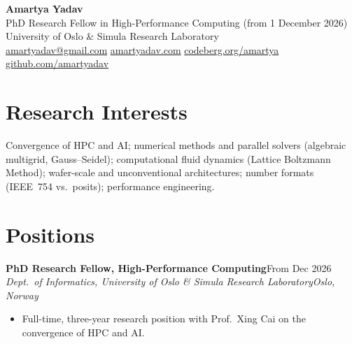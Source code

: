\documentclass[10pt,a4paper]{article}
\newcommand{\entry}[4]{%
  \textbf{#1}\hfill #2\\
  \textit{#3}\hfill \textit{#4}\par\vspace{2pt}}
\begin{document}
{\centering
  {\LARGE\bfseries Amartya Yadav}\\[4pt]
  PhD Research Fellow in High-Performance Computing (from 1 December 2026)\\
  University of Oslo \& Simula Research Laboratory\\[4pt]
  \href{mailto:amartyadav@gmail.com}{amartyadav@gmail.com} \;\textbar\;
  \href{https://amartyadav.com}{amartyadav.com} \;\textbar\;
  \href{https://codeberg.org/amartya}{codeberg.org/amartya} \;\textbar\;
  \href{https://github.com/amartyadav}{github.com/amartyadav}\par
}

\section*{Research Interests}
Convergence of HPC and AI; numerical methods and parallel solvers (algebraic multigrid, Gauss--Seidel);
computational fluid dynamics (Lattice Boltzmann Method); wafer-scale and unconventional architectures;
number formats (IEEE~754 vs.\ posits); performance engineering.

\section*{Positions}

\entry{PhD Research Fellow, High-Performance Computing}{From Dec 2026}
      {Dept.\ of Informatics, University of Oslo \& Simula Research Laboratory}{Oslo, Norway}
\begin{itemize}
  \item Full-time, three-year research position with Prof.\ Xing Cai on the convergence of HPC and AI.
\end{itemize}
\end{document}
